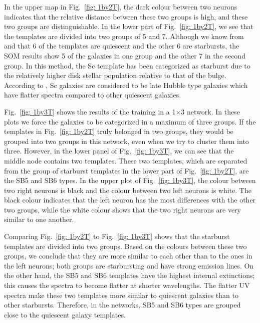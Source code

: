         
            In the upper map in Fig.~\ref{fig: 1by2T}, the dark colour between two neurons indicates that the relative distance between these two groups is high, and these two groups are distinguishable.
            In the lower part of Fig.~\ref{fig: 1by2T}, we see that the templates are divided into two groups of 5 and 7.
            Although we know from  and  that 6 of the templates are quiescent and the other 6 are starbursts, the SOM results show 5 of the galaxies in one group and the other 7 in the second group.
            In this method, the Sc template has been categorized as starburst due to the relatively higher disk stellar population relative to that of the bulge. 
            According to , Sc galaxies are considered to be late Hubble type galaxies which have  flatter spectra compared to other quiescent galaxies. 
            

            Fig.~\ref{fig: 1by3T} shows the results of the training in a 1$\times$3 network.
            In these plots we force the galaxies to be categorized in a maximum of three groups. 
            If the templates in Fig.~\ref{fig: 1by2T} truly belonged in two groups, they would be grouped into two groups in this network, even when we try to cluster them into three. 
            However, in the lower panel of Fig.~\ref{fig: 1by3T}, we can see that the middle node contains two templates.
            These two templates, which are separated from the group of starburst templates in the lower part of Fig.~\ref{fig: 1by2T},  are the SB5 and SB6 types.
            In the upper plot of Fig.~\ref{fig: 1by3T}, the colour between two right neurons is black and the colour between two left neurons is white. 
            The black colour indicates that the left neuron has the most differences with the other two groups,
            while the white colour shows that the two right neurons are very similar to one another. 
            
            Comparing Fig.~\ref{fig: 1by2T} to Fig.~\ref{fig: 1by3T} shows that the starburst templates are divided into two groups. 
            Based on the colours between these two groups, we conclude that they are more similar to each other than to the ones in the left neurons; both groups are starbursting and have strong emission lines.
            On the other hand, the SB5 and SB6 templates have the highest internal extinctions; this causes the spectra to become flatter at shorter wavelengths. 
            The flatter UV spectra make these two templates more similar to quiescent galaxies than to other starbursts.
            Therefore, in the networks, SB5 and SB6 types are grouped close to the quiescent galaxy templates.
                
